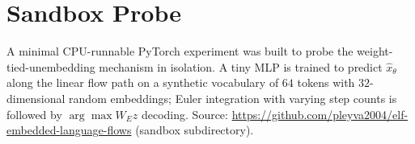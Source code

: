 \documentclass[11pt]{article}
\begin{document}
\section*{Sandbox Probe}
A minimal CPU-runnable PyTorch experiment was built to probe the weight-tied-unembedding mechanism in isolation. A tiny MLP is trained to predict $\hat{x}_\theta$ along the linear flow path on a synthetic vocabulary of $64$ tokens with $32$-dimensional random embeddings; Euler integration with varying step counts is followed by $\arg\max W_E z$ decoding. Source: \url{https://github.com/pleyva2004/elf-embedded-language-flows} (sandbox subdirectory).



\end{document}
